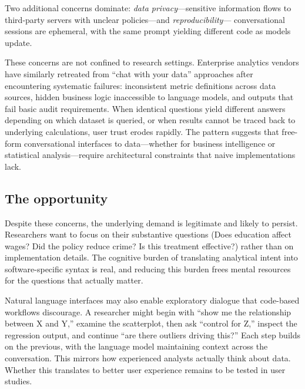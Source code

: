Two additional concerns dominate: \emph{data privacy}---sensitive information
flows to third-party servers with unclear policies---and \emph{reproducibility}---
conversational sessions are ephemeral, with the same prompt yielding different
code as models update.

These concerns are not confined to research settings. Enterprise analytics vendors
have similarly retreated from ``chat with your data'' approaches after encountering
systematic failures: inconsistent metric definitions across data sources, hidden
business logic inaccessible to language models, and outputs that fail basic audit
requirements. When identical questions yield different answers depending on which
dataset is queried, or when results cannot be traced back to underlying
calculations, user trust erodes rapidly. The pattern suggests that free-form
conversational interfaces to data---whether for business intelligence or
statistical analysis---require architectural constraints that naive
implementations lack.

\subsection{The opportunity}

Despite these concerns, the underlying demand is legitimate and likely to
persist. Researchers want to focus on their substantive questions (Does
education affect wages? Did the policy reduce crime? Is this treatment
effective?) rather than on implementation details. The cognitive burden of
translating analytical intent into software-specific syntax is real, and
reducing this burden frees mental resources for the questions
that actually matter.

Natural language interfaces may also enable exploratory dialogue that code-based
workflows discourage. A researcher might begin with
``show me the relationship between X and Y,'' examine the scatterplot, then ask
``control for Z,'' inspect the regression output, and continue ``are there
outliers driving this?'' Each step builds on the previous, with the language
model maintaining context across the conversation. This mirrors how experienced
analysts actually think about data. Whether this translates to better user
experience remains to be tested in user studies.

